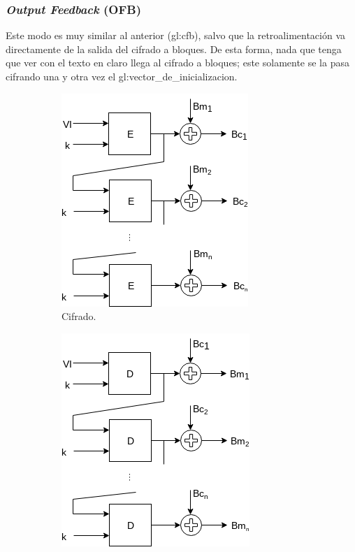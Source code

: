 %
%

\subsubsection{\textit{Output Feedback} (OFB)}
\label{sec:ofb}

Este modo es muy similar al anterior (\gls{gl:cfb}), salvo que la
retroalimentación va directamente de la salida del cifrado a bloques. De esta
forma, nada que tenga que ver con el texto en claro llega al cifrado a bloques;
este solamente se la pasa cifrando una y otra vez el
\gls{gl:vector_de_inicializacion}.

\begin{figure}
  \centering
  \begin{subfigure}{0.45\textwidth}
    \begin{center}
      \includegraphics[width=0.7\linewidth]{diagramas/modo_ofb.png}
      \caption{Cifrado.}
    \end{center}
  \end{subfigure}
  \begin{subfigure}{0.45\textwidth}
    \begin{center}
      \includegraphics[width=0.7\linewidth]{diagramas/modo_ofb_inverso.png}

\end{center}
\end{subfigure}
\end{figure}
